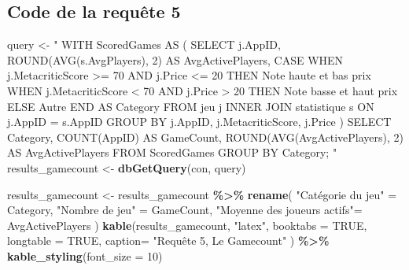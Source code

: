 \documentclass[mstat,12pt]{unswthesis}
\newenvironment{Shaded}{\begin{snugshade}}{\end{snugshade}}
\newcommand{\AttributeTok}[1]{\textcolor[rgb]{0.13,0.29,0.53}{#1}}
\newcommand{\ConstantTok}[1]{\textcolor[rgb]{0.56,0.35,0.01}{#1}}
\newcommand{\DecValTok}[1]{\textcolor[rgb]{0.00,0.00,0.81}{#1}}
\newcommand{\FunctionTok}[1]{\textcolor[rgb]{0.13,0.29,0.53}{\textbf{#1}}}
\newcommand{\NormalTok}[1]{#1}
\newcommand{\OtherTok}[1]{\textcolor[rgb]{0.56,0.35,0.01}{#1}}
\newcommand{\SpecialCharTok}[1]{\textcolor[rgb]{0.81,0.36,0.00}{\textbf{#1}}}
\newcommand{\StringTok}[1]{\textcolor[rgb]{0.31,0.60,0.02}{#1}}
\begin{document}
\hypertarget{code-de-la-requuxeate-5}{%
\subsection*{Code de la requête 5}\label{code-de-la-requuxeate-5}}

\begin{Shaded}
\begin{Highlighting}[]
\NormalTok{query }\OtherTok{\textless{}{-}} \StringTok{"}
\StringTok{WITH ScoredGames AS (}
\StringTok{  SELECT}
\StringTok{    j.AppID,}
\StringTok{    ROUND(AVG(s.AvgPlayers), 2) AS AvgActivePlayers,}
\StringTok{    CASE}
\StringTok{      WHEN j.MetacriticScore \textgreater{}= 70 }
\StringTok{        AND j.Price \textless{}= 20 THEN \textquotesingle{}Note haute et bas prix\textquotesingle{}}
\StringTok{      WHEN j.MetacriticScore \textless{} 70 }
\StringTok{        AND j.Price \textgreater{} 20 THEN \textquotesingle{}Note basse et haut prix\textquotesingle{}}
\StringTok{      ELSE \textquotesingle{}Autre\textquotesingle{}}
\StringTok{    END AS Category}
\StringTok{  FROM jeu j}
\StringTok{  INNER JOIN statistique s ON j.AppID = s.AppID}
\StringTok{  GROUP BY j.AppID, j.MetacriticScore, j.Price}
\StringTok{)}
\StringTok{SELECT}
\StringTok{  Category,}
\StringTok{  COUNT(AppID) AS GameCount,}
\StringTok{  ROUND(AVG(AvgActivePlayers), 2) AS AvgActivePlayers}
\StringTok{FROM ScoredGames}
\StringTok{GROUP BY Category;}
\StringTok{"}
\NormalTok{results\_gamecount }\OtherTok{\textless{}{-}} \FunctionTok{dbGetQuery}\NormalTok{(con, query)}
\end{Highlighting}
\end{Shaded}

\begin{Shaded}
\begin{Highlighting}[]
\NormalTok{results\_gamecount }\OtherTok{\textless{}{-}}\NormalTok{ results\_gamecount }\SpecialCharTok{\%\textgreater{}\%}
  \FunctionTok{rename}\NormalTok{(}
    \StringTok{"Catégorie du jeu"} \OtherTok{=}\NormalTok{ Category,}
    \StringTok{"Nombre de jeu"} \OtherTok{=}\NormalTok{ GameCount,}
    \StringTok{"Moyenne des joueurs actifs"}\OtherTok{=}\NormalTok{ AvgActivePlayers}
\NormalTok{  )}
\FunctionTok{kable}\NormalTok{(results\_gamecount, }\StringTok{"latex"}\NormalTok{, }\AttributeTok{booktabs =} \ConstantTok{TRUE}\NormalTok{, }\AttributeTok{longtable =} \ConstantTok{TRUE}\NormalTok{, }
      \AttributeTok{caption=} \StringTok{"Requête 5, Le Gamecount"}\NormalTok{ ) }\SpecialCharTok{\%\textgreater{}\%}
  \FunctionTok{kable\_styling}\NormalTok{(}\AttributeTok{font\_size =} \DecValTok{10}\NormalTok{)}
\end{Highlighting}
\end{Shaded}
\end{document}
